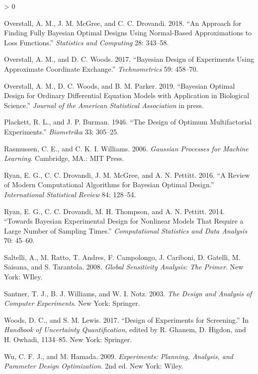 \documentclass[
  ignorenonframetext,
]{beamer}
\newlength{\cslhangindent}
\newenvironment{CSLReferences}[2] %
 {%
  \setlength{\parindent}{0pt}
  \ifodd #1 \everypar{\setlength{\hangindent}{\cslhangindent}}\ignorespaces\fi
  \ifnum #2 > 0
  \setlength{\parskip}{#2\baselineskip}
  \fi
 }%
 {}
\begin{document}
\begin{frame}{}
\begin{CSLReferences}{1}{0}
\leavevmode\hypertarget{ref-OMD2018}{}%
Overstall, A. M., J. M. McGree, and C. C. Drovandi. 2018. {``An Approach
for Finding Fully {B}ayesian Optimal Designs Using Normal-Based
Approximations to Loss Functions.''} \emph{Statistics and Computing} 28:
343--58.

\leavevmode\hypertarget{ref-OW2017}{}%
Overstall, A. M., and D. C. Woods. 2017. {``Bayesian Design of
Experiments Using Approximate Coordinate Exchange.''}
\emph{Technometrics} 59: 458--70.

\leavevmode\hypertarget{ref-OWP2019}{}%
Overstall, A. M., D. C. Woods, and B. M. Parker. 2019. {``Bayesian
Optimal Design for Ordinary Differential Equation Models with
Application in Biological Science.''} \emph{Journal of the American
Statistical Association} in press.

\leavevmode\hypertarget{ref-PB1946}{}%
Plackett, R. L., and J. P. Burman. 1946. {``The Design of Optimum
Multifactorial Experiments.''} \emph{Biometrika} 33: 305--25.

\leavevmode\hypertarget{ref-RW2006}{}%
Rasmussen, C. E., and C. K. I. Williams. 2006. \emph{Gaussian Processes
for Machine Learning}. Cambridge, MA.: MIT Press.

\leavevmode\hypertarget{ref-RDMP2016}{}%
Ryan, E. G., C. C. Drovandi, J. M. McGree, and A. N. Pettitt. 2016. {``A
Review of Modern Computational Algorithms for {B}ayesian Optimal
Design.''} \emph{International Statistical Review} 84: 128--54.

\leavevmode\hypertarget{ref-RDTP2014}{}%
Ryan, E. G., C. C. Drovandi, M. H. Thompson, and A. N. Pettitt. 2014.
{``Towards {B}ayesian Experimental Design for Nonlinear Models That
Require a Large Number of Sampling Times.''} \emph{Computational
Statistics and Data Analysis} 70: 45--60.

\leavevmode\hypertarget{ref-SRACCGST2008}{}%
Saltelli, A., M. Ratto, T. Andres, F. Campolongo, J. Cariboni, D.
Gatelli, M. Saisana, and S. Tarantola. 2008. \emph{Global Sensitivity
Analysis: The Primer}. New York: WIley.

\leavevmode\hypertarget{ref-SWN2003}{}%
Santner, T. J., B. J. Williams, and W. I. Notz. 2003. \emph{The Design
and Analysis of Computer Experiments}. New York: Springer.

\leavevmode\hypertarget{ref-WL2017}{}%
Woods, D. C., and S. M. Lewis. 2017. {``Design of Experiments for
Screening.''} In \emph{Handbook of Uncertainty Quantification}, edited
by R. Ghanem, D. Higdon, and H. Owhadi, 1134--85. New York: Springer.

\leavevmode\hypertarget{ref-WH2009}{}%
Wu, C. F. J., and M. Hamada. 2009. \emph{Experiments: Planning,
Analysis, and Parameter Design Optimization}. 2nd ed. New York: Wiley.

\end{CSLReferences}
\end{frame}
\end{document}
